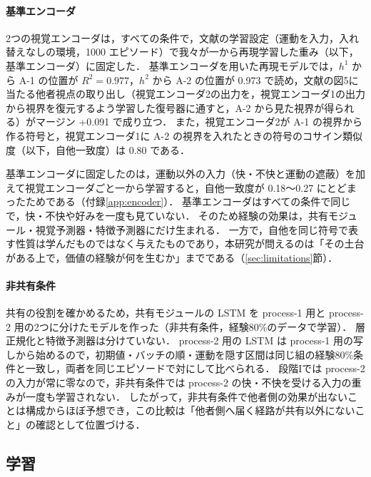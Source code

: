 \paragraph{基準エンコーダ}
2つの視覚エンコーダは，すべての条件で，文献\cite{noguchi2022superposition}の学習設定（運動を入力，入れ替えなしの環境，1000 エピソード）で我々が一から再現学習した重み（以下，基準エンコーダ）に固定した．
基準エンコーダを用いた再現モデルでは，$h^1$ から A-1 の位置が $R^2=0.977$，$h^2$ から A-2 の位置が 0.973 で読め，文献\cite{noguchi2022superposition}の図5に当たる他者視点の取り出し（視覚エンコーダ2の出力を，視覚エンコーダ1の出力から視界を復元するよう学習した復号器に通すと，A-2 から見た視界が得られる）がマージン +0.091 で成り立つ．
また，視覚エンコーダ2が A-1 の視界から作る符号と，視覚エンコーダ1に A-2 の視界を入れたときの符号のコサイン類似度（以下，自他一致度）は 0.80 である．

基準エンコーダに固定したのは，運動以外の入力（快・不快と運動の遮蔽）を加えて視覚エンコーダごと一から学習すると，自他一致度が 0.18〜0.27 にとどまったためである（付録\ref{app:encoder}）．
基準エンコーダはすべての条件で同じで，快・不快や好みを一度も見ていない．
そのため経験の効果は，共有モジュール・視覚予測器・特徴予測器にだけ生まれる．
一方で，自他を同じ符号で表す性質は学んだものではなく与えたものであり，本研究が問えるのは「その土台がある上で，価値の経験が何を生むか」までである（\ref{sec:limitations}節）．

\paragraph{非共有条件}
共有の役割を確かめるため，共有モジュールの LSTM を process-1 用と process-2 用の2つに分けたモデルを作った（非共有条件，経験80\%のデータで学習）．
層正規化と特徴予測器は分けていない．
process-2 用の LSTM は process-1 用の写しから始めるので，初期値・バッチの順・運動を隠す区間は同じ組の経験80\%条件と一致し，両者を同じエピソードで対にして比べられる．
段階Iでは process-2 の入力が常に零なので，非共有条件では process-2 の快・不快を受ける入力の重みが一度も学習されない．
したがって，非共有条件で他者側の効果が出ないことは構成からほぼ予想でき，この比較は「他者側へ届く経路が共有以外にないこと」の確認として位置づける．

\subsection{学習}\label{sec:training}

